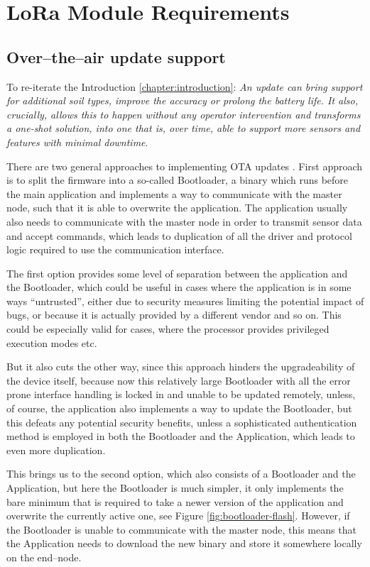 \section{LoRa Module Requirements}
\subsection{\label{section:ota-update-support}Over--the--air update support}
To re-iterate the Introduction \ref{chapter:introduction}: \emph{An update can bring support for additional soil types, improve the accuracy or prolong the battery life. It also, crucially, allows this to happen without any operator intervention and transforms a one-shot solution, into one that is, over time, able to support more sensors and features with minimal downtime}.

There are two general approaches to implementing OTA updates \cite{bucklin_brown_over--air_2024,noauthor_android_2024}. First approach is to split the firmware into a so-called Bootloader, a binary which runs before the main application and implements a way to communicate with the master node, such that it is able to overwrite the application. The application usually also needs to communicate with the master node in order to transmit sensor data and accept commands, which leads to duplication of all the driver and protocol logic required to use the communication interface.

The first option provides some level of separation between the application and the Bootloader, which could be useful in cases where the application is in some ways ``untrusted'', either due to security measures limiting the potential impact of bugs, or because it is actually provided by a different vendor and so on. This could be especially valid for cases, where the processor provides privileged execution modes etc.

But it also cuts the other way, since this approach hinders the upgradeability of the device itself, because now this relatively large Bootloader with all the error prone interface handling is locked in and unable to be updated remotely, unless, of course, the application also implements a way to update the Bootloader, but this defeats any potential security benefits, unless a sophisticated authentication method is employed in both the Bootloader and the Application, which leads to even more duplication.

This brings us to the second option, which also consists of a Bootloader and the Application, but here the Bootloader is much simpler, it only implements the bare minimum that is required to take a newer version of the application and overwrite the currently active one, see Figure \ref{fig:bootloader-flash}. However, if the Bootloader is unable to communicate with the master node, this means that the Application needs to download the new binary and store it somewhere locally on the end--node.

